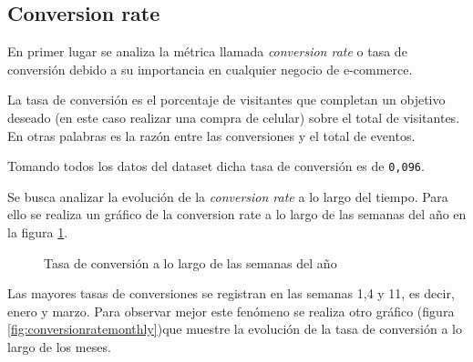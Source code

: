 \documentclass[a4paper]{article}
\begin{document}
\subsection{Conversion rate}

En primer lugar se analiza la métrica llamada \textit{conversion rate} o tasa de conversión debido a su importancia en cualquier negocio de e-commerce.

La tasa de conversión es el porcentaje de visitantes que completan un objetivo deseado (en este caso realizar una compra de celular) sobre el total de visitantes. En otras palabras es la razón entre las conversiones y el total de eventos.

Tomando todos los datos del dataset dicha tasa de conversión es de \texttt{0,096}. 
	
Se busca analizar la evolución de la \textit{conversion rate} a lo largo del tiempo. Para ello se realiza un gráfico de la conversion rate a lo largo de las semanas del año en la figura \ref{fig:conversionrate}.

\begin{figure}[h!]
	\caption{Tasa de conversión a lo largo de las semanas del año}
	\label{fig:conversionrate}
\end{figure}

Las mayores tasas de conversiones se registran en las semanas 1,4 y 11, es decir, enero y marzo. Para observar mejor este fenómeno se realiza otro gráfico (figura \ref{fig:conversionratemonthly})que muestre la evolución de la tasa de conversión a lo largo de los meses. 
\end{document}
